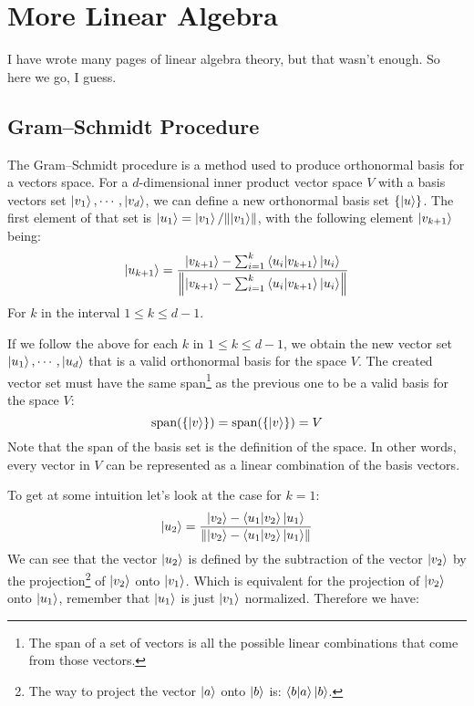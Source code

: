 \chapter{More Linear Algebra}
I have wrote many pages of linear algebra theory, but that wasn't enough. So here we go, I guess.

\section{Gram–Schmidt Procedure}\label{gram}
The Gram–Schmidt procedure is a method used to produce orthonormal basis for a vectors space. For a $d$-dimensional inner product vector space $V$ with a basis vectors set $\ket{v_1}, \cdots, \ket{v_d}$, we can define a new orthonormal basis set $\{\ket{u}\}$. The first element of that set is $\ket{u_1} = \ket{v_1}/\norm{\ket{v_1}}$, with the following element $\ket{v_{k+1}}$  being:
$$
\ket{u_{k+1}} = \frac{\ket{v_{k+1}} - \sum_{i=1}^{k} \bra{u_i}\ket{v_{k+1}}\ket{u_i}}{\norm{\ket{v_{k+1}} - \sum_{i=1}^{k} \bra{u_i}\ket{v_{k+1}}\ket{u_i}}}
$$
For $k$ in the interval $1 \leq k \leq d-1$.

If we follow the above for each $k$ in $1 \leq k \leq d-1$, we obtain the new vector set $\ket{u_1}, \cdots , \ket{u_d}$ that is a valid orthonormal basis for the space $V$. The created vector set must have the same span\footnote{The span of a set of vectors is all the possible linear combinations that come from those vectors.} as the previous one to be a valid basis for the space $V$:
$$
\text{span}(\{\ket{v}\}) = \text{span}(\{\ket{v}\}) = V
$$
Note that the span of the basis set is the definition of the space. In other words, every vector in $V$ can be represented as a linear combination of the basis vectors. 

To get at some intuition let's look at the case for $k=1$:
$$
\ket{u_2} = \frac{\ket{v_2} - \bra{u_1}\ket{v_2}\ket{u_1}}{\norm{\ket{v_2} - \bra{u_1}\ket{v_2}\ket{u_1}}}
$$
We can see that the vector $\ket{u_2}$ is defined by the subtraction of the vector $\ket{v_2}$ by the projection\footnote{The way to project the vector $\ket{a}$ onto $\ket{b}$ is: $\bra{b}\ket{a}\ket{b}$.} of $\ket{v_2}$ onto $\ket{v_1}$. Which is equivalent for the projection of $\ket{v_2}$ onto $\ket{u_1}$, remember that $\ket{u_1}$ is just $\ket{v_1}$ normalized. Therefore we have: 
\begin{figure}
\end{figure}


